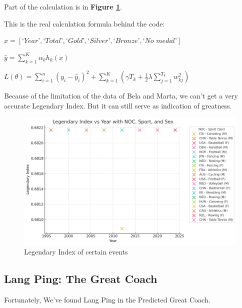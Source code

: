 Part of the calculation is in \textbf{Figure \ref{fig:legendary_index_detailed}}.

This is the real calculation formula behind the code\cite{miller2020comparative}:
\begin{center}
$ x = [\textit{`Year'}, \textit{`Total'}, \textit{`Gold'}, \textit{`Silver'}, \textit{`Bronze'}, \textit{`No medal'}]$

$\hat{y} = \sum_{k=1}^{K} \alpha_k h_k(x)$

$L(\theta) = \sum_{i=1}^{n} \left( y_i - \hat{y}_i \right)^2 + \sum_{k=1}^{K} \left( \gamma T_k + \frac{1}{2} \lambda \sum_{j=1}^{T_k} w_{kj}^2 \right)$

\end{center}

Because of the limitation of the data of Bela and Marta, we can't get a very accurate Legendary Index. But it can still serve as indication of greatness.

\begin{figure}[h]
\centering
    \includegraphics[width=1\textwidth]{./figures/Lengendary_index_detailed.png}
    \caption{Legendary Index of certain events}
    \label{fig:legendary_index_detailed}
\end{figure}

\subsection{Lang Ping: The Great Coach}

Fortunately, We've found Lang Ping in the Predicted Great Coach.

